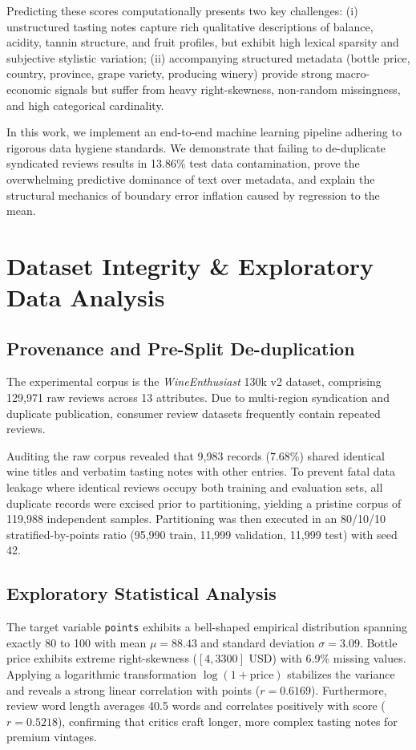 \documentclass[conference]{IEEEtran}
\begin{document}
Predicting these scores computationally presents two key challenges: (i) unstructured tasting notes capture rich qualitative descriptions of balance, acidity, tannin structure, and fruit profiles, but exhibit high lexical sparsity and subjective stylistic variation; (ii) accompanying structured metadata (bottle price, country, province, grape variety, producing winery) provide strong macro-economic signals but suffer from heavy right-skewness, non-random missingness, and high categorical cardinality.

In this work, we implement an end-to-end machine learning pipeline adhering to rigorous data hygiene standards. We demonstrate that failing to de-duplicate syndicated reviews results in 13.86\% test data contamination, prove the overwhelming predictive dominance of text over metadata, and explain the structural mechanics of boundary error inflation caused by regression to the mean.

\section{Dataset Integrity \& Exploratory Data Analysis}
\subsection{Provenance and Pre-Split De-duplication}
The experimental corpus is the \textit{WineEnthusiast} 130k v2 dataset, comprising 129,971 raw reviews across 13 attributes. Due to multi-region syndication and duplicate publication, consumer review datasets frequently contain repeated reviews. 

Auditing the raw corpus revealed that 9,983 records (7.68\%) shared identical wine titles and verbatim tasting notes with other entries. To prevent fatal data leakage where identical reviews occupy both training and evaluation sets, all duplicate records were excised prior to partitioning, yielding a pristine corpus of 119,988 independent samples. Partitioning was then executed in an 80/10/10 stratified-by-points ratio (95,990 train, 11,999 validation, 11,999 test) with seed 42.

\subsection{Exploratory Statistical Analysis}
The target variable \texttt{points} exhibits a bell-shaped empirical distribution spanning exactly 80 to 100 with mean $\mu = 88.43$ and standard deviation $\sigma = 3.09$. Bottle price exhibits extreme right-skewness ($[4, 3300]$ USD) with 6.9\% missing values. Applying a logarithmic transformation $\log(1 + \text{price})$ stabilizes the variance and reveals a strong linear correlation with points ($r = 0.6169$). Furthermore, review word length averages 40.5 words and correlates positively with score ($r = 0.5218$), confirming that critics craft longer, more complex tasting notes for premium vintages.
\end{document}
